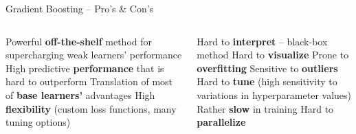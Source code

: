 \begin{frame}{Gradient Boosting -- Pro's \& Con's}

\footnotesize

\begin{columns}[onlytextwidth]
  \begin{column}{0.5\textwidth}
    \footnotesize
    \begin{itemize}
      \positem Powerful \textbf{off-the-shelf} method for supercharging weak 
      learners' performance
      \positem High predictive \textbf{performance} that is hard to outperform
      \positem Translation of most of \textbf{base learners'} advantages 
      \positem High \textbf{flexibility} (custom loss functions, many tuning 
      options) 
    \end{itemize}
  \end{column}
  \begin{column}{0.5\textwidth}
    \footnotesize
    \begin{itemize}
      \negitem Hard to \textbf{interpret} -- black-box method
      \negitem Hard to \textbf{visualize}
      \negitem Prone to \textbf{overfitting}
      \negitem Sensitive to \textbf{outliers}
      \negitem Hard to \textbf{tune} (high sensitivity to variations in 
      hyperparameter values)
      \negitem Rather \textbf{slow} in training
      \negitem Hard to \textbf{parallelize}
    \end{itemize}
  \end{column}
\end{columns}

\vfill

\small


\end{frame}


